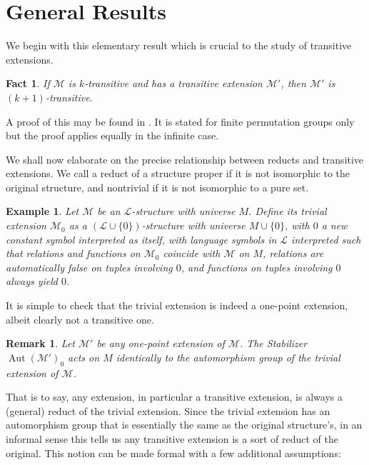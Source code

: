 \documentclass{amsart}
\newtheorem{remark}[theorem]{Remark}
\newtheorem{example}[theorem]{Example}
\newtheorem{fact}[theorem]{Fact}
\def\lang{\mathcal{L}}
\newcommand{\set}[1]{\{#1 \}}
\newcommand{\model}{\mathcal{M}}
\DeclareMathOperator{\Aut}{Aut}
\begin{document}
\section{General Results}

We begin with this elementary result which is crucial to the study of transitive extensions.

\begin{fact}\label{transitivity degree jump fact}
    If $\model$ is $k$-transitive and has a transitive extension $\mathcal{M}'$, then $\mathcal{M}'$ is $(k+1)$-transitive.
\end{fact}
A proof of this may be found in \cite{biggs1979permutation}. It is stated for finite permutation groups only but the proof applies equally in the infinite case.

We shall now elaborate on the precise relationship between reducts and transitive extensions. We call a reduct of a structure proper if it is not isomorphic to the original structure, and nontrivial if it is not isomorphic to a pure set.


\begin{example}
    Let $\model$ be an $\lang$-structure with universe $M$. Define its trivial extension $\model_0$ as a $(\lang \cup \set{0})$-structure with universe $M \cup \set{0}$, with $0$ a new constant symbol interpreted as itself, with language symbols in $\lang$ interpreted such that relations and functions on $\model_0$ coincide with $\model$ on $M$, relations are automatically false on tuples involving $0$, and functions on tuples involving $0$ always yield $0$. 
\end{example}

It is simple to check that the trivial extension is indeed a one-point extension, albeit clearly not a transitive one.

\begin{remark}
    Let $\model'$ be any one-point extension of $\model$. The Stabilizer $\Aut(\model')_0$ acts on $M$ identically to the automorphism group of the trivial extension of $\model$.
\end{remark}

That is to say, any extension, in particular a transitive extension, is always a (general) reduct of the trivial extension. Since the trivial extension has an automorphism group that is essentially the same as the original structure's, in an informal sense this tells us any transitive extension is a sort of reduct of the original. This notion can be made formal with a few additional assumptions:
\end{document}

